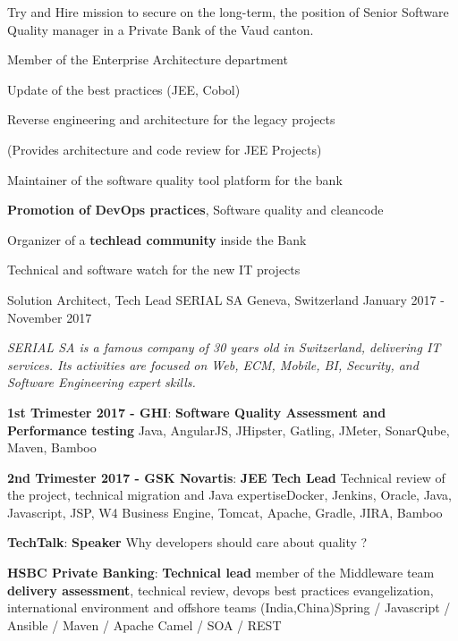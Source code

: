 \begin{cventries}
{\begin{cvitems}
            \item {Try and Hire mission to secure on the long-term, the position of Senior Software Quality manager in a Private Bank of the Vaud canton.}
            \item{Member of the Enterprise Architecture department}
            \item{Update of the best practices (JEE, Cobol)}
            \item{Reverse engineering and architecture for the legacy projects}
            \item(Provides architecture and code review for JEE Projects)
            \item {Maintainer of the software quality tool platform for the bank}
            \item {\textbf{Promotion of DevOps practices}, Software quality and cleancode}
            \item {Organizer of a \textbf{techlead community }inside the Bank}
            \item {Technical and software watch for the new IT projects}
        \end{cvitems}
    }
    \cventry
    {Solution Architect, Tech Lead} %
    {SERIAL SA} %
    {Geneva, Switzerland} %
    {January 2017 - November 2017} %
    {
        \begin{cvitems} %
            \item {\textit{SERIAL SA is a famous company of 30 years old in Switzerland, delivering IT services. Its activities are focused on Web, ECM, Mobile, BI, Security, and Software Engineering expert skills.}}
            \item { \textbf{1st Trimester 2017 - GHI}: \textbf{Software Quality Assessment and Performance testing} \newline Java, AngularJS, JHipster, Gatling, JMeter, SonarQube, Maven, Bamboo}
            \item { \textbf{2nd Trimester 2017 - GSK Novartis}: \textbf{JEE Tech Lead} \newline Technical review of the project, technical migration and Java expertise\newline Docker, Jenkins, Oracle, Java, Javascript, JSP, W4 Business Engine, Tomcat, Apache, Gradle, JIRA, Bamboo}
            \item { \textbf{TechTalk}: \textbf{Speaker} \newline Why developers should care about quality ?}
            \item { \textbf{HSBC Private Banking}: \textbf{Technical lead} \newline member of the Middleware team  \textbf{delivery assessment}, technical review, devops best practices evangelization, international environment and offshore teams (India,China)\newline Spring / Javascript / Ansible / Maven / Apache Camel / SOA / REST}
        \end{cvitems}
    }


\end{cventries}
